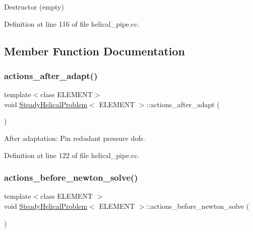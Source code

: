 Destructor (empty) 



Definition at line 116 of file helical\+\_\+pipe.\+cc.



\subsection{Member Function Documentation}
\mbox{\label{classSteadyHelicalProblem_a7fb3fb4cfb399e20ac52816f9cdfc68d}} 
\subsubsection{\texorpdfstring{actions\+\_\+after\+\_\+adapt()}{actions\_after\_adapt()}}
{\footnotesize\ttfamily template$<$class E\+L\+E\+M\+E\+NT$>$ \\
void \hyperlink{classSteadyHelicalProblem}{Steady\+Helical\+Problem}$<$ E\+L\+E\+M\+E\+NT $>$\+::actions\+\_\+after\+\_\+adapt (\begin{DoxyParamCaption}{ }\end{DoxyParamCaption})\hspace{0.3cm}{\ttfamily [inline]}}



After adaptation\+: Pin redudant pressure dofs. 



Definition at line 122 of file helical\+\_\+pipe.\+cc.

\mbox{\label{classSteadyHelicalProblem_a446b8b3e090f8349dc2c5de68190d6a4}} 
\subsubsection{\texorpdfstring{actions\+\_\+before\+\_\+newton\+\_\+solve()}{actions\_before\_newton\_solve()}}
{\footnotesize\ttfamily template$<$class E\+L\+E\+M\+E\+NT $>$ \\
void \hyperlink{classSteadyHelicalProblem}{Steady\+Helical\+Problem}$<$ E\+L\+E\+M\+E\+NT $>$\+::actions\+\_\+before\+\_\+newton\+\_\+solve (\begin{DoxyParamCaption}{ }\end{DoxyParamCaption})}



